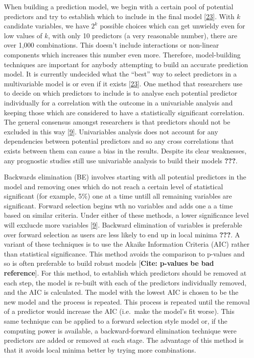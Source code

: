 \documentclass[
]{article}
\begin{document}
When building a prediction model, we begin with a certain pool of potential predictors and try to establish which to include in the final model {[}\protect\hyperlink{ref-sauerbrei_selection_2007}{23}{]}. With \(k\) candidate variables, we have \(2^k\) possible choices which can get unwieldy even for low values of \(k\), with only 10 predictors (a very reasonable number), there are over 1,000 combinations. This doesn't include interactions or non-linear components which increases this number even more. Therefore, model-building techniques are important for anybody attempting to build an accurate prediction model. It is currently undecided what the ``best'' way to select predictors in a multivariable model is or even if it exists {[}\protect\hyperlink{ref-sauerbrei_selection_2007}{23}{]}. One method that researchers use to decide on which predictors to include is to analyse each potential predictor individually for a correlation with the outcome in a univariable analysis and keeping those which are considered to have a statistically significant correlation. The general consensus amongst researchers is that predictors should not be excluded in this way {[}\protect\hyperlink{ref-royston_prognosis_2009}{9}{]}. Univariables analysis does not account for any dependencies between potential predictors and so any cross correlations that exists between them can cause a bias in the results. Despite its clear weaknesses, any prognostic studies still use univariable analysis to build their models {\textbf{???}}.

Backwards elimination (BE) involves starting with all potential predictors in the model and removing ones which do not reach a certain level of statistical significant (for example, 5\%) one at a time untill all remaining variables are significant. Forward selection begins wth no variables and adds one a a time based on similar criteria. Under either of these methods, a lower significance level will exxlucde more variables {[}\protect\hyperlink{ref-royston_prognosis_2009}{9}{]}. Backward elimination of variables is preferable over forward selection as users are less likely to end up in local minima {\textbf{???}}. A variant of these techniques is to use the Akaike Information Criteria (AIC) rather than statistical significance. This method avoids the comparison to p-values and so is often preferable to build robust models {[}\textbf{Cite: p-values be bad reference}{]}. For this method, to establish which predictors should be removed at each step, the model is re-built with each of the predictors individually removed, and the AIC is calculated. The model with the lowest AIC is chosen to be the new model and the process is repeated. This process is repeated until the removal of a predictor would increase the AIC (i.e.~make the model's fit worse). This same technique can be applied to a forward selection style model or, if the computing power is available, a backward-forward elimination technique were predictors are added or removed at each stage. The advantage of this method is that it avoids local minima better by trying more combinations.
\end{document}
